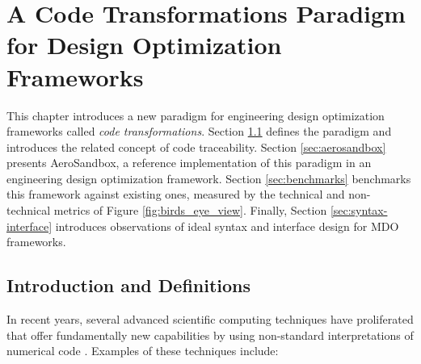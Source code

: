 \chapter{A Code Transformations Paradigm for Design Optimization Frameworks}
\label{chap:code_transformations}

This chapter introduces a new paradigm for engineering design optimization frameworks called \textit{code transformations}. Section \ref{sec:definitions} defines the paradigm and introduces the related concept of code traceability. Section \ref{sec:aerosandbox} presents AeroSandbox, a reference implementation of this paradigm in an engineering design optimization framework. Section \ref{sec:benchmarks} benchmarks this framework against existing ones, measured by the technical and non-technical metrics of Figure \ref{fig:birds_eye_view}. Finally, Section \ref{sec:syntax-interface} introduces observations of ideal syntax and interface design for MDO frameworks.

\section{Introduction and Definitions}
\label{sec:definitions}

In recent years, several advanced scientific computing techniques have proliferated that offer fundamentally new capabilities by using non-standard interpretations of numerical code \cite{rackauckas_generalizing_2021}. Examples of these techniques include:

